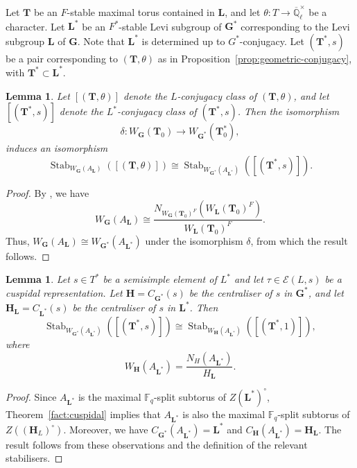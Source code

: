 \documentclass{amsart}
\theoremstyle{plain}
\numberwithin{equation}{section}
\newtheorem{lemma}[theorem]{Lemma}
\theoremstyle{definition}
\newcommand{\cE}{\mathcal{E}}
\newcommand{\Stab}{\operatorname{Stab}}
\newcommand{\bG}{\mathbf{G}}
\newcommand{\bL}{\mathbf{L}}
\newcommand{\bT}{\mathbf{T}}
\newcommand{\bH}{\mathbf{H}}
\begin{document}
Let $\bT$ be an $F$-stable maximal torus contained in $\bL$, and let $\theta : T \to \overline{\mathbb{Q}}_{\ell}^{\times}$ be a character. Let $\bL^{*}$ be an $F^{*}$-stable Levi subgroup of $\bG^{*}$ corresponding to the Levi subgroup $\bL$ of $\bG$. Note that $\bL^{*}$ is determined up to $G^{*}$-conjugacy.
Let $(\bT^{*}, s)$ be a pair corresponding to $(\bT, \theta)$ as in Proposition~\ref{prop:geometric-conjugacy}, with $\bT^{*} \subset \bL^{*}$.

\begin{lemma}\label{lem:dual-stabilizers-geometric-pairs}
Let $[(\bT, \theta)]$ denote the $L$-conjugacy class of $(\bT, \theta)$, and let $[(\bT^{*}, s)]$ denote the $L^{*}$-conjugacy class of $(\bT^{*}, s)$. Then the isomorphism
\[
\delta : W_{\bG}(\bT_{0}) \longrightarrow W_{\bG^{*}}(\bT_{0}^{*}),
\]
induces an isomorphism
\[
\Stab_{W_{\bG}(A_{\bL})} \left( [(\bT, \theta)] \right) \cong \Stab_{W_{\bG^{*}}(A_{\bL^{*}})} \left( [(\bT^{*}, s)] \right).
\]
\end{lemma}
\begin{proof}
By \cite[Proposition~2.1]{HowlettLehrer}, we have
\[
W_{\bG}(A_{\bL}) \cong \frac{N_{W_{\bG}(\bT_{0})^{F}}(W_{\bL}(\bT_{0})^{F})}{W_{\bL}(\bT_{0})^{F}}.
\]
Thus, $W_{\bG}(A_{\bL}) \cong W_{\bG^{*}}(A_{\bL^{*}})$ under the isomorphism $\delta$, from which the result follows.
\end{proof}

\begin{lemma}\label{lem:centralizer-stabilizer-geometric-pair}
Let $s \in T^{*}$ be a semisimple element of $L^{*}$ and let $\tau\in \cE(L,s)$ be a cuspidal representation.
Let $\bH = C_{\bG^{*}}(s)$ be the centraliser of $s$ in $\bG^{*}$, and let $\bH_{\bL} = C_{\bL^{*}}(s)$ be the centraliser of $s$ in $\bL^{*}$.
Then
\[
\Stab_{W_{\bG^{*}}(A_{\bL^{*}})} \left( [(\bT^{*}, s)] \right) \cong \Stab_{W_{\bH}(A_{\bL^{*}})} \left( [(\bT^{*}, 1)] \right),
\]
where
\[
W_{\bH}(A_{\bL^{*}}) = \frac{N_{H}(A_{\bL^{*}})}{H_{\bL}}.
\]
\end{lemma}

\begin{proof}
Since $A_{\bL^{*}}$ is the maximal $\mathbb{F}_{q}$-split subtorus of $Z(\bL^{*})^{\circ}$, Theorem~\ref{fact:cuspidal} implies that $A_{\bL^{*}}$ is also the maximal $\mathbb{F}_{q}$-split subtorus of $Z((\bH_L)^{\circ})$. Moreover, we have $C_{\bG^{*}}(A_{\bL^{*}}) = \bL^{*}$ and $C_{\bH}(A_{\bL^{*}}) = \bH_{\bL}$. The result follows from these observations and the definition of the relevant stabilisers.
\end{proof}
\end{document}
